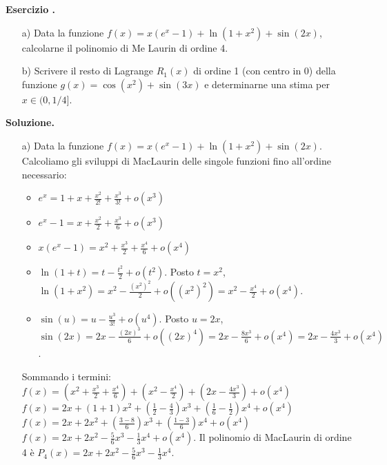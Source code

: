 \documentclass[12pt, a4paper]{article}
\newcounter{examcounter}
\newcounter{exercisecounter}[examcounter]
\newenvironment{exercise}{%
    \stepcounter{exercisecounter}%
    \par\noindent\textbf{Esercizio \theexercisecounter.}\medskip\par
    \normalfont
}{\par\bigskip}
\newenvironment{solution}{%
    \par\noindent\textbf{Soluzione.}\medskip\par
    \normalfont
}{\par\bigskip}
\begin{document}
\begin{exercise}
\begin{enumerate}
    \item[a)] Data la funzione $f(x) = x(e^{x}-1) + \ln(1+x^{2}) + \sin(2x)$, calcolarne il polinomio di Me Laurin di ordine 4.
    \item[b)] Scrivere il resto di Lagrange $R_{1}(x)$ di ordine 1 (con centro in 0) della funzione $g(x) = \cos(x^{2}) + \sin(3x)$ e determinarne una stima per $x \in (0, 1/4]$.
\end{enumerate}
\end{exercise}
\begin{solution}
\begin{enumerate}
    \item[a)] Data la funzione $f(x) = x(e^{x}-1) + \ln(1+x^{2}) + \sin(2x)$. Calcoliamo gli sviluppi di MacLaurin delle singole funzioni fino all'ordine necessario:
    \begin{itemize}
        \item $e^x = 1 + x + \frac{x^2}{2!} + \frac{x^3}{3!} + o(x^3)$
        \item $e^x - 1 = x + \frac{x^2}{2} + \frac{x^3}{6} + o(x^3)$
        \item $x(e^x - 1) = x^2 + \frac{x^3}{2} + \frac{x^4}{6} + o(x^4)$
        \item $\ln(1+t) = t - \frac{t^2}{2} + o(t^2)$. Posto $t=x^2$, $\ln(1+x^2) = x^2 - \frac{(x^2)^2}{2} + o((x^2)^2) = x^2 - \frac{x^4}{2} + o(x^4)$.
        \item $\sin(u) = u - \frac{u^3}{3!} + o(u^4)$. Posto $u=2x$, $\sin(2x) = 2x - \frac{(2x)^3}{6} + o((2x)^4) = 2x - \frac{8x^3}{6} + o(x^4) = 2x - \frac{4x^3}{3} + o(x^4)$.
    \end{itemize}
    Sommando i termini:
    $f(x) = \left(x^2 + \frac{x^3}{2} + \frac{x^4}{6}\right) + \left(x^2 - \frac{x^4}{2}\right) + \left(2x - \frac{4x^3}{3}\right) + o(x^4)$
    $f(x) = 2x + (1+1)x^2 + \left(\frac{1}{2} - \frac{4}{3}\right)x^3 + \left(\frac{1}{6} - \frac{1}{2}\right)x^4 + o(x^4)$
    $f(x) = 2x + 2x^2 + \left(\frac{3-8}{6}\right)x^3 + \left(\frac{1-3}{6}\right)x^4 + o(x^4)$
    $f(x) = 2x + 2x^2 - \frac{5}{6}x^3 - \frac{1}{3}x^4 + o(x^4)$.
    Il polinomio di MacLaurin di ordine 4 è $P_4(x) = 2x + 2x^2 - \frac{5}{6}x^3 - \frac{1}{3}x^4$.


\end{enumerate}
\end{solution}
\end{document}
